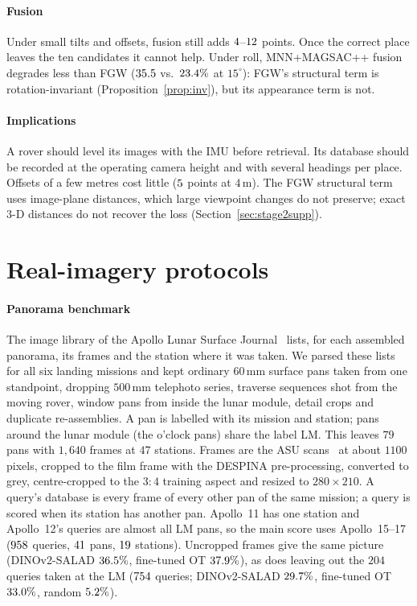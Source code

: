 \documentclass[letterpaper,journal]{IEEEtran}
\newcommand{\cref}[1]{Proposition~\ref{#1}}
\begin{document}
\paragraph*{Fusion} Under small tilts and offsets, fusion still adds $4$--$12$ points. Once the
correct place leaves the ten candidates it cannot help. Under roll, MNN+MAGSAC++ fusion degrades less than
FGW ($35.5$ vs.\ $23.4\%$ at $15^\circ$): FGW's structural term is
rotation-invariant (\cref{prop:inv}), but its appearance term is not.

\paragraph*{Implications} A rover should level its images with the IMU before retrieval. Its database should
be recorded at the operating camera height and with several headings per place. Offsets of a few metres
cost little ($5$ points at $4$\,m). The FGW structural term uses image-plane distances, which
large viewpoint changes do not preserve; exact 3-D distances do not recover the loss (Section~\ref{sec:stage2supp}).

\section{Real-imagery protocols}\label{sec:realsupp}
\paragraph*{Panorama benchmark} The image library of the Apollo Lunar Surface Journal~\cite{alsj} lists, for
each assembled panorama, its frames and the station where it was taken. We parsed these lists for all six
landing missions and kept ordinary $60$\,mm surface pans taken from one standpoint, dropping $500$\,mm
telephoto series, traverse sequences shot from the moving rover, window pans from inside the lunar module,
detail crops and duplicate re-assemblies. A pan is labelled with its mission and station; pans around the
lunar module (the o'clock pans) share the label LM. This leaves $79$ pans with $1{,}640$ frames at $47$
stations. Frames are the ASU scans~\cite{asuapollo} at about $1100$ pixels, cropped to the film frame with the
DESPINA pre-processing, converted to grey, centre-cropped to the $3{:}4$ training aspect and resized to
$280\times210$. A query's database is every frame of every other pan of the same mission; a query is scored
when its station has another pan. Apollo~11 has one station and Apollo~12's queries are almost all LM pans,
so the main score uses Apollo~15--17 ($958$ queries, $41$ pans, $19$ stations). Uncropped frames
give the same picture (DINOv2-SALAD $36.5\%$, fine-tuned OT $37.9\%$), as does leaving out the
$204$ queries taken at the LM ($754$ queries; DINOv2-SALAD $29.7\%$, fine-tuned OT
$33.0\%$, random $5.2\%$).
\end{document}

